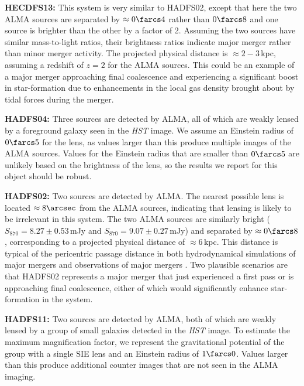 \documentclass[iop]{emulateapj}
\begin{document}
{\bf HECDFS13:} This system is very similar to HADFS02, except that here the two
ALMA sources are separated by $\approx 0\farcs4$ rather than $0\farcs8$ and one
source is brighter than the other by a factor of 2.  Assuming the two sources
have similar mass-to-light ratios, their brightness ratios indicate major
merger rather than minor merger activity.  The projected physical distance is
$\approx 2-3\,$kpc, assuming a redshift of $z=2$ for the ALMA sources.  This
could be an example of a major merger approaching final coalescence and
experiencing a significant boost in star-formation due to enhancements in the
local gas density brought about by tidal forces during the merger.

{\bf HADFS04:} Three sources are detected by ALMA, all of which are weakly
lensed by a foreground galaxy seen in the {\it HST} image.  We assume an
Einstein radius of $0\farcs5$ for the lens, as values larger than this produce
multiple images of the ALMA sources.  Values for the Einstein radius that are
smaller than $0\farcs5$ are unlikely based on the brightness of the lens, so
the results we report for this object should be robust.

{\bf HADFS02:} Two sources are detected by ALMA.  The nearest possible lens is
located $\approx 8\arcsec$ from the ALMA sources, indicating that lensing is
likely to be irrelevant in this system.  The two ALMA sources are similarly
bright ($S_{870} = 8.27 \pm 0.53\,$mJy and $S_{870} = 9.07 \pm 0.27\,$mJy) and
separated by $\approx 0\farcs8$, corresponding to a projected physical distance
of $\approx 6\,$kpc. This distance is typical of the pericentric passage
distance in both hydrodynamical simulations of major mergers
\citep[e.g.,][]{Hayward:2012lr} and observations of major mergers
\citep[e.g.,][]{Ivison:2007qv, 2008ApJ...680..246T, 2010ApJ...724..233E,
2011ApJ...733L..11R, 2011MNRAS.412.1913I}.  Two plausible scenarios are that
HADFS02 represents a major merger that just experienced a first pass or is
approaching final coalescence, either of which would significantly enhance
star-formation in the system.

{\bf HADFS11:} Two sources are detected by ALMA, both of which are weakly
lensed by a group of small galaxies detected in the {\it HST} image.  To
estimate the maximum magnification factor, we represent the gravitational
potential of the group with a single SIE lens and an Einstein radius of
$1\farcs0$.  Values larger than this produce additional counter images that are
not seen in the ALMA imaging.
\end{document}
